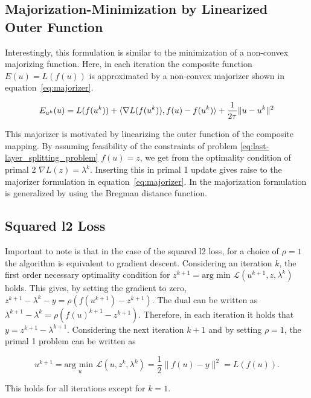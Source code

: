 \documentclass[english,11pt,a4paper]{article}
\begin{document}
\subsection{Majorization-Minimization by Linearized Outer Function}

Interestingly, this formulation is similar to the minimization of a non-convex majorizing function. Here, in each iteration the composite function $E(u) = L(f(u))$ is approximated by a non-convex majorizer shown in equation~\ref{eq:majorizer}.

\begin{equation}
	E_{u^k}(u) = L(f(u^k))
	+ \langle \nabla L(f(u^k)), f(u)-f(u^k) \rangle
	+ \frac{1}{2 \tau} \|u - u^k \|^2
	\label{eq:majorizer}
\end{equation}

This majorizer is motivated by linearizing the outer function of the composite mapping. By assuming feasibility of the constraints of problem \ref{eq:last-layer_splitting_problem} $f(u) = z$, we get from the optimality condition of primal 2 $\nabla L(z) = \lambda^k$. Inserting this in primal 1 update gives raise to the majorizer formulation in equation~\ref{eq:majorizer}. In \cite{geiping2018composite} the majorization formulation is generalized by using the Bregman distance function.

\subsection{Squared l2 Loss}

Important to note is that in the case of the squared l2 loss, for a choice of $\rho=1$ the algorithm is equivalent to gradient descent. Considering an iteration $k$, the first order necessary optimality condition for $z^{k+1} = \text{arg min } \mathcal{L}(u^{k+1}, z, \lambda^k)$ holds. This gives, by setting the gradient to zero, $z^{k+1} - \lambda^k - y = \rho(f(u^{k+1}) - z^{k+1})$. The dual can be written as $\lambda^{k+1} - \lambda^k = \rho(f(u)^{k+1} - z^{k+1})$. Therefore, in each iteration it holds that $y = z^{k+1} - \lambda^{k+1}$. Considering the next iteration $k+1$ and by setting $\rho=1$, the primal 1 problem can be written as 

\begin{equation}
	u^{k+1} = \underset{u}{\text{arg min }} \mathcal{L}(u, z^k, \lambda^k)
	= \frac{1}{2} \|f(u) - y\|^2 = L(f(u)).
\end{equation}

This holds for all iterations except for $k=1$.
\end{document}
